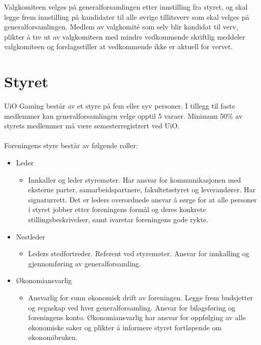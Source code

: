 \documentclass[12pt,a4paper,norsk]{article}
\begin{document}
Valgkomiteen velges på generalforsamlingen etter innstilling fra styret, og skal legge frem innstilling på kandidater til alle øvrige tillitsverv som skal velges på generalforsamlingen. Medlem av valgkomité som selv blir kandidat til verv, plikter å tre ut av valgkomiteen med mindre vedkommende skriftlig meddeler valgkomiteen og forslagsstiller at vedkommende ikke er aktuell for vervet.



\section{Styret}

UiO Gaming består av et styre på fem eller syv personer. I tillegg til faste medlemmer kan generalforsamlingen velge opptil 5 varaer. Minimum 50\% av styrets medlemmer må være semesterregistrert ved UiO.
\\
\\
Foreningens styre består av følgende roller:
\begin{itemize}
    \item Leder
    \begin{itemize}
        \item Innkaller og leder styremøter. Har ansvar for kommunikasjonen med eksterne parter, samarbeidspartnere, fakultetsstyret og leverandører. Har signaturrett. Det er leders overordnede ansvar å sørge for at alle personer i styret jobber etter foreningens formål og deres konkrete stillingsbeskrivelser, samt ivaretar foreningens gode rykte.
    \end{itemize}

    \item Nestleder
    \begin{itemize}
        \item Leders stedfortreder. Referent ved styremøter. Ansvar for innkalling og gjennomføring av generalforsamling.
    \end{itemize}

    \item Økonomiansvarlig
    \begin{itemize}
        \item Ansvarlig for sunn økonomisk drift av foreningen. Legge frem budsjetter og regnskap ved hver generalforsamling. Ansvar for bilagsføring og foreningens konto. Økonomiansvarlig har ansvar for oppfølging av alle økonomiske saker og plikter å informere styret fortløpende om økonomibruken.
    \end{itemize}
\end{itemize}
\leavevmode
\end{document}
